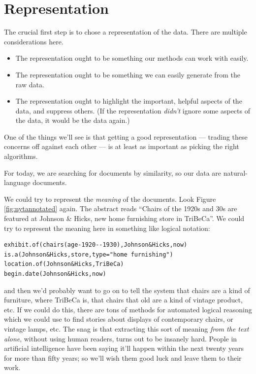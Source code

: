 \documentclass{article}
\begin{document}
\section{Representation}

The crucial first step is to chose a representation of the data.  There are
multiple considerations here.
\begin{itemize}
\item The representation ought to be something our methods can work with easily.
\item The representation ought to be something we can easily generate from the
  raw data.
\item The representation ought to highlight the important, helpful aspects of
  the data, and suppress others.  (If the representation {\em didn't} ignore
  some aspects of the data, it would be the data again.)
\end{itemize}
One of the things we'll see is that getting a good representation --- trading
these concerns off against each other --- is at least as important as picking
the right algorithms.

For today, we are searching for documents by similarity, so our data are
natural-language documents.

We could try to represent the {\em meaning} of the documents.  Look Figure
\ref{fig:nytannotated} again.  The abstract reads ``Chairs of the 1920s and 30s
are featured at Johnson \& Hicks, new home furnishing store in TriBeCa''.
We could try to represent the meaning here in something like logical
notation:
\begin{verbatim}
exhibit.of(chairs(age-1920--1930),Johnson&Hicks,now)
is.a(Johnson&Hicks,store,type="home furnishing")
location.of(Johnson&Hicks,TriBeCa)
begin.date(Johnson&Hicks,now)
\end{verbatim}
and then we'd probably want to go on to tell the system that chairs are a kind
of furniture, where TriBeCa is, that chairs that old are a kind of vintage
product, etc.  If we could do this, there are tons of methods for automated
logical reasoning which we could use to find stories about displays of
contemporary chairs, or vintage lamps, etc.  The snag is that extracting this
sort of meaning {\em from the text alone}, without using human readers, turns
out to be insanely hard.  People in artificial intelligence have been saying
it'll happen within the next twenty years for more than fifty years; so we'll
wish them good luck and leave them to their work.
\end{document}
